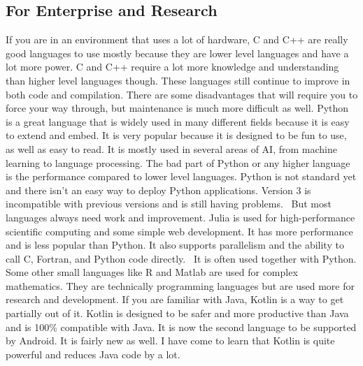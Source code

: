 \documentclass[letterpaper, 10 pt, conference]{IEEEtran}
\begin{document}
\subsection{For Enterprise and Research}
\indent If you are in an environment that uses a lot of hardware, C and C++ are really good languages to use mostly because they are lower level languages and have a lot more power. C and C++ require a lot more knowledge and understanding than higher level languages though. These languages still continue to improve in both code and compilation. There are some disadvantages that will require you to force your way through, but maintenance is much more difficult as well. Python is a great language that is widely used in many different fields because it is easy to extend and embed. It is very popular because it is designed to be fun to use, as well as easy to read. It is mostly used in several areas of AI, from machine learning to language processing. The bad part of Python or any higher language is the performance compared to lower level languages. Python is not standard yet and there isn't an easy way to deploy Python applications. Version 3 is incompatible with previous versions and is still having problems. ~\cite{TheBest}But most languages always need work and improvement.  Julia is used for high-performance scientific computing and some simple web development. It has more performance and is less popular than Python. It also supports parallelism and the ability to call C, Fortran, and Python code directly.~\cite{TheBest} It is often used together with Python. Some other small languages like R and Matlab are used for complex mathematics. They are technically programming languages but are used more for research and development. If you are familiar with Java, Kotlin is a way to get partially out of it. Kotlin is designed to be safer and more productive than Java and is 100\% compatible with Java. It is now the second language to be supported by Android. It is fairly new as well. I have come to learn that Kotlin is quite powerful and reduces Java code by a lot.
\newline
\end{document}
